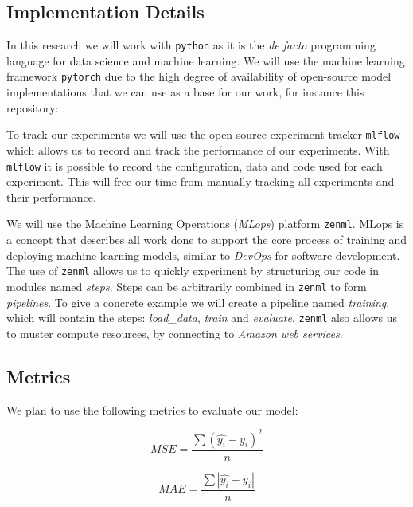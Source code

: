\documentclass[acmtog, authorversion]{acmart}
\begin{document}
\subsection{Implementation Details}

In this research we will work with \texttt{python} as it is the \textit{de facto} programming language for data science and machine learning. We will use the machine learning framework \texttt{pytorch} due to the high degree of availability of open-source model implementations that we can use as a base for our work, for instance this repository: \cite{openclimatefix-no-date}.
\medskip

To track our experiments we will use the open-source experiment tracker \texttt{mlflow} which allows us to record and track the performance of our experiments. With \texttt{mlflow} it is possible to record the configuration, data and code used for each experiment. This will free our time from manually tracking all experiments and their performance.
\medskip

We will use the Machine Learning Operations (\textit{MLops}) platform \texttt{zenml}. MLops is a concept that describes all work done to support the core process of training and deploying machine learning models, similar to \textit{DevOps} for software development. The use of \texttt{zenml} allows us to quickly experiment by structuring our code in modules named \textit{steps}. Steps can be arbitrarily combined in \texttt{zenml} to form \textit{pipelines}. To give a concrete example we will create a pipeline named \textit{training}, which will contain the steps: \textit{load\_data}, \textit{train} and \textit{evaluate}. \texttt{zenml} also allows us to muster compute resources, by connecting to \textit{Amazon web services}.




\subsection{Metrics}
We plan to use the following metrics to evaluate our model:

\begin{equation}
MSE = \frac{\sum (\hat{y_i} -y_i)^2}{n}
\end{equation}

\begin{equation}
MAE = \frac{\sum |\hat{y_i} -y_i|}{n}
\end{equation}
\end{document}
